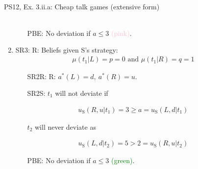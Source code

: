 \begin{frame}{PS12, Ex. 3.ii.a: Cheap talk games (extensive form)}
\begin{multicols}{2}
\begin{enumerate}
\begin{align*}
        \end{align*}\vspace{-18pt}
        \begin{itemize}\normalsize
          \item[PBE:] No deviation if $a\leq3$ \textcolor{Pink}{(pink)}.
        \end{itemize}
        \item SR3: R: Beliefs given S's strategy:\vspace{-8pt}
        \begin{align*}
          \mu(t_1|L)=p=0\text{ and }\mu(t_1|R)=q=1
        \end{align*}\vspace{-18pt}
        \begin{itemize}\normalsize
          \item[SR2R:] R: $a^*(L)=d,\ a^*(R)=u$.
          \item[SR2S:] $t_1$ will not deviate if
        \end{itemize}\vspace{-10pt}
        \begin{align*}
          u_\text{S}(R,u|t_1)=3\geq a=u_\text{S}(L,d|t_1)
        \end{align*}\vspace{-18pt}
        \begin{itemize}\normalsize
          \item[] $t_2$ will never deviate as
        \end{itemize}\vspace{-10pt}
        \begin{align*}
          u_\text{S}(L,d|t_2)=5>2=u_\text{S}(R,u|t_2)
        \end{align*}\vspace{-18pt}
        \begin{itemize}\normalsize
          \item[PBE:] No deviation if $a\leq3$ \textcolor{green}{(green)}.
        \end{itemize}
      \end{enumerate}
      \vfill\null
    \end{multicols}
\end{frame}

